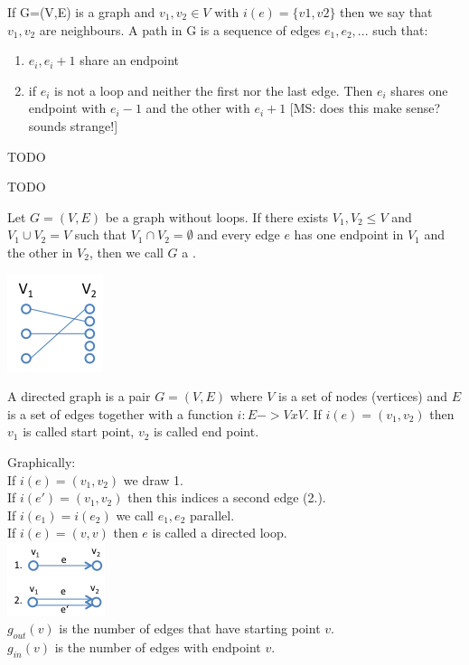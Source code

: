 \begin{definition}
    If G=(V,E) is a graph and $v{_1}, v{_2} \in V$ with $i(e) = \{v1, v2\}$ then we say that $v{_1}, v{_2}$ are neighbours. A path in G is a sequence of edges $e{_1}, e{_2}, ...$ such that: \\
\begin{enumerate}
\item $e{_i}, e{_i+1}$ share an endpoint
\item if $e{_i}$ is not a loop and neither the first nor the last edge. Then $e{_i}$ shares one endpoint with $e{_i-1}$ and the other with $e{_i+1}$ [MS: does this make sense? sounds strange!]
\end{enumerate}
\end{definition}
\begin{definition}
    TODO
\end{definition}
\begin{lemma}
    TODO
\end{lemma}

\begin{definition}
    Let $G = (V,E)$ be a graph without loops. If there exists $V_{1}, V_{2} \leq V$ and $V_{1} \cup V_{2} = V$
    such that $V_{1} \cap V_{2} = \emptyset$ and every edge $e$ has one endpoint in $V{_1}$ and the other in $V_{2}$,
    then we call $G$ a .
\end{definition}

\begin{example*}
    \includegraphics{diagrams/def14_example1.png}
\end{example*}

\begin{definition}
    A directed graph is a pair $G = (V,E)$ where $V$ is a set of nodes (vertices) and $E$ is a set of edges together 
    with a function $i: E -> V x V$. If $i(e) = (v_{1},v_{2})$ then $v_{1}$ is called start point, $v_{2}$ is called end point.
\end{definition}
Graphically: \\[3mm]
If $i(e) = (v_{1},v_{2})$ we draw 1. \\
If $i(e') = (v_{1},v_{2})$ then this indices a second edge (2.). \\
If $i(e_{1}) = i(e_{2})$ we call $e_{1},e_{2}$ parallel. \\
If $i(e) = (v,v)$ then $e$ is called a directed loop. \\
\includegraphics{diagrams/def15_directd_graph.png} \\
$g_{out}(v)$ is the number of edges that have starting point $v$. \\
$g_{in}(v)$ is the number of edges with endpoint $v$.

